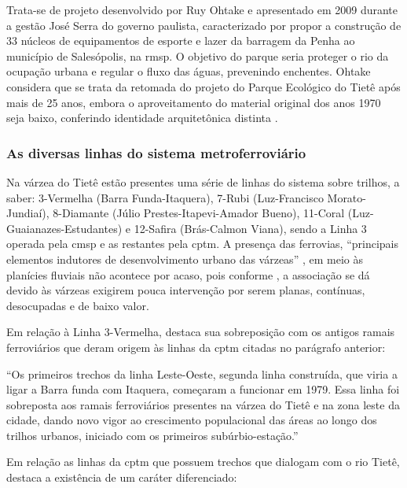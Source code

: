 \documentclass[
article,			%
11pt,				%
oneside,			%
a4paper,			%
english,			%
brazil,				%
sumario=tradicional
]{abntex2}
\begin{document}
	Trata-se de projeto desenvolvido por Ruy Ohtake e apresentado em 2009 durante a gestão José Serra do governo paulista, caracterizado por propor a construção de 33 núcleos de equipamentos de esporte e lazer da barragem da Penha ao município de Salesópolis, na \gls{rmsp}. O objetivo do parque seria proteger o rio da ocupação urbana e regular o fluxo das águas, prevenindo enchentes. Ohtake considera que se trata da retomada do projeto do Parque Ecológico do Tietê após mais de 25 anos, embora o aproveitamento do material original dos anos 1970 seja baixo, conferindo identidade arquitetônica distinta \cite[p. 157]{leitao2014a}.
	
	\subsubsection{As diversas linhas do sistema metroferroviário} \label{s3:divferrovias}
	
	Na várzea do Tietê estão presentes uma série de linhas do sistema sobre trilhos, a saber: 3-Vermelha (Barra Funda-Itaquera), 7-Rubi (Luz-Francisco Morato-Jundiaí), 8-Diamante (Júlio Prestes-Itapevi-Amador Bueno), 11-Coral (Luz-Guaianazes-Estudantes) e 12-Safira (Brás-Calmon Viana), sendo a Linha 3 operada pela \glsdesc{cmsp} e as restantes pela \glsdesc{cptm}. A presença das ferrovias, ``principais elementos indutores de desenvolvimento urbano das várzeas'' \cite[p. 247]{franco2005a}, em meio às planícies fluviais não acontece por acaso, pois conforme \cite[p. 247]{franco2005a}, a associação se dá devido às várzeas exigirem pouca intervenção por serem planas, contínuas, desocupadas e de baixo valor.
	
	Em relação à Linha 3-Vermelha,  destaca sua sobreposição com os antigos ramais ferroviários que deram origem às linhas da \gls{cptm} citadas no parágrafo anterior:
	
	\begin{citacao}
		``Os primeiros trechos da linha Leste-Oeste, segunda linha 		construída, que viria a ligar a Barra funda com Itaquera, começaram a funcionar em 1979. Essa linha foi sobreposta aos ramais ferroviários presentes na várzea do Tietê e na zona 	leste da cidade, dando novo vigor ao crescimento populacional das áreas ao longo dos	trilhos urbanos, iniciado com os primeiros subúrbio-estação.''
	\end{citacao}
	
	Em relação as linhas da \gls{cptm} que possuem trechos que dialogam com o rio Tietê,  destaca a existência de um caráter diferenciado:
	
\end{document}
